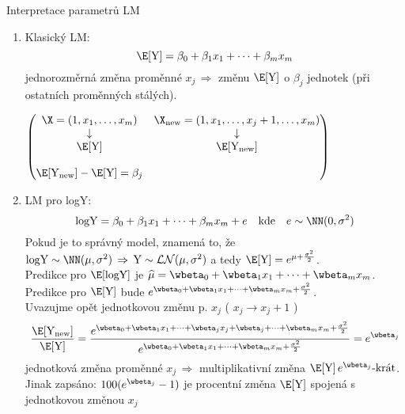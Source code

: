 Interpretace parametrů LM

\begin{enumerate}
\item Klasický LM: 
$$
 \E [ \text{Y} ] = \beta_0 + \beta_1 x_1 + \dots + \beta_m x_m
$$
jednorozměrná změna proměnné $ x_j \, \Rightarrow $ změnu $ \E [ \text{Y} ] $ o $ \beta_j $ jednotek (při ostatních proměnných stálých).

$ 
\left( \begin{matrix}
\X = (1,x_1,\dots,x_m) & \X_{\text{new}} = (1,x_1,\dots,x_j+1,\dots,x_m) \\
\downarrow &  \downarrow \\
\E [ \text{Y} ] & \E [ \text{Y}_{\text{new}} ] \\
 & \\
 \E [ \text{Y}_{\text{new}} ] - \E [ \text{Y} ]  = \beta_j &
\end{matrix} \right)
$
\item LM pro logY:
$$
 \text{logY} = \beta_0 + \beta_1 x_1 + \dots + \beta_m x_m + e \quad \text{kde} \quad e \sim \NN(0,\sigma^2)
$$
Pokud je to správný model, znamená to, že $ \text{logY} \sim \NN(\mu,\sigma^2) \, \Rightarrow \, \text{Y} \sim \mathcal{LN}(\mu,\sigma^2) $ a tedy $ \E[\text{Y}] = e^{\mu + \frac{\sigma^2}{2}} $. \\
Predikce pro $ \E [\text{logY}] $ je $ \widehat{\mu} = \wbeta_0 + \wbeta_1 x_1 + \dots + \wbeta_m x_m $. \\
Predikce pro $ \E [\text{Y}] $ bude $ e^{\wbeta_0 + \wbeta_1 x_1 + \dots + \wbeta_m x_m + \frac{\sigma^2}{2}} $. \\
Uvazujme opět jednotkovou změnu p. $ x_j $ ( $ x_j \rightarrow x_j + 1 $ )
$$
\dfrac{ \E [ \text{Y}_{\text{new}} ]}{\E [ \text{Y} ]} = \dfrac{e^{\wbeta_0 + \wbeta_1 x_1 + \dots + \wbeta_j x_j + \wbeta_j + \dots + \wbeta_m x_m + \frac{\sigma^2}{2}}}{e^{\wbeta_0 + \wbeta_1 x_1 + \dots + \wbeta_m x_m + \frac{\sigma^2}{2}}} = e^{\wbeta_j}
$$
jednotková změna proměnné $ x_j \, \Rightarrow  $ multiplikativní změna $ \E [ \text{Y} ] \, e^{\wbeta_j}\text{-krát} $.\\
Jinak zapsáno: $ 100(e^{\wbeta_j}-1) $ je procentní změna $ \E [ \text{Y} ]  $ spojená s jednotkovou změnou $ x_j $
\end{enumerate}